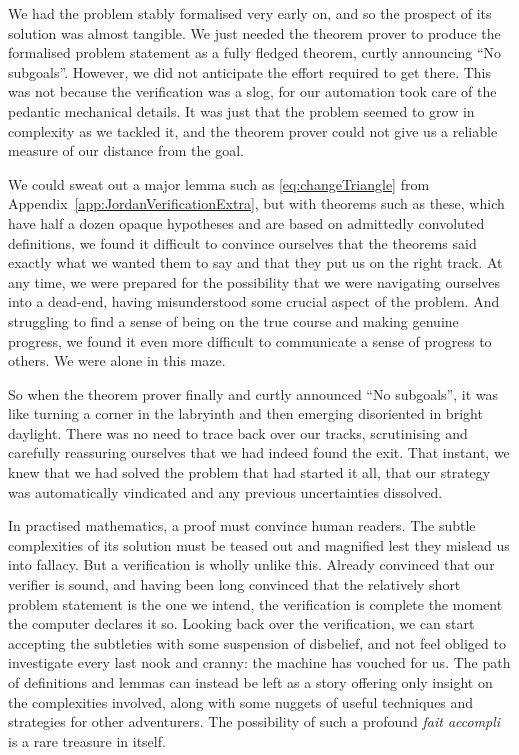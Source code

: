 We had the problem stably formalised very early on, and so the prospect of its solution was almost tangible. We just needed the theorem prover to produce the formalised problem statement as a fully fledged theorem, curtly announcing ``No subgoals''. However, we did not anticipate the effort required to get there. This was not because the verification was a slog, for our automation took care of the pedantic mechanical details. It was just that the problem seemed to grow in complexity as we tackled it, and the theorem prover could not give us a reliable measure of our distance from the goal.

We could sweat out a major lemma such as \ref{eq:changeTriangle} from Appendix~\ref{app:JordanVerificationExtra}, but with theorems such as these, which have half a dozen opaque hypotheses and are based on admittedly convoluted definitions, we found it difficult to convince ourselves that the theorems said exactly what we wanted them to say and that they put us on the right track. 
At any time, we were prepared for the possibility that we were navigating ourselves into a dead-end, having misunderstood some crucial aspect of the problem. And struggling to find a sense of being on the true course and making genuine progress, we found it even more difficult to communicate a sense of progress to others. We were alone in this maze.

So when the theorem prover finally and curtly announced ``No subgoals'', it was like turning a corner in the labryinth and then emerging disoriented in bright daylight. There was no need to trace back over our tracks, scrutinising and carefully reassuring ourselves that we had indeed found the exit. That instant, we knew that we had solved the problem that had started it all, that our strategy was automatically vindicated and any previous uncertainties dissolved.

In practised mathematics, a proof must convince human readers. The subtle complexities of its solution must be teased out and magnified lest they mislead us into fallacy. But a verification is wholly unlike this. Already convinced that our verifier is sound, and having been long convinced that the relatively short problem statement is the one we intend, the verification is complete the moment the computer declares it so. Looking back over the verification, we can start accepting the subtleties with some suspension of disbelief, and not feel obliged to investigate every last nook and cranny: the machine has vouched for us. The path of definitions and lemmas can instead be left as a story offering only insight on the complexities involved, along with some nuggets of useful techniques and strategies for other adventurers. The possibility of such a profound \emph{fait accompli} is a rare treasure in itself.

